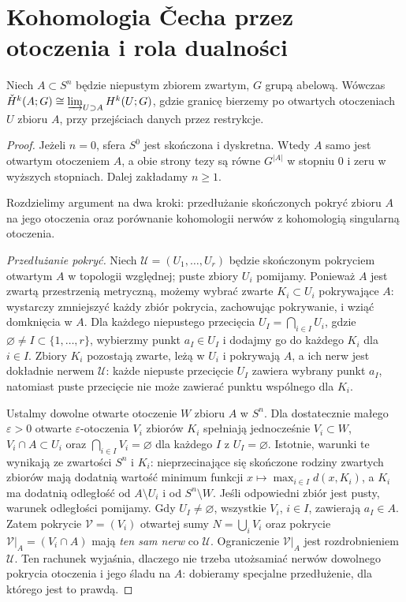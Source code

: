 \section{Kohomologia \v{C}echa przez otoczenia i rola dualności}
\begin{twierdzenie}
\label{thm:cech-neighbourhood-v4}
Niech $A\subset S^n$ będzie niepustym zbiorem zwartym,
$G$ grupą abelową. Wówczas
$\check H^k(A;G)\cong\varinjlim_{U\supset A}H^k(U;G)$,
gdzie granicę bierzemy po otwartych otoczeniach $U$ zbioru
$A$, przy przejściach danych przez restrykcje.
\end{twierdzenie}
\begin{proof}
Jeżeli $n=0$, sfera $S^0$ jest skończona i dyskretna.
Wtedy $A$ samo jest otwartym otoczeniem $A$, a obie strony
tezy są równe $G^{|A|}$ w stopniu $0$ i zeru w wyższych
stopniach. Dalej zakładamy $n\geq1$.

Rozdzielimy argument na dwa kroki: przedłużanie skończonych
pokryć zbioru $A$ na jego otoczenia oraz porównanie
kohomologii nerwów z kohomologią singularną otoczenia.

\emph{Przedłużanie pokryć.}
Niech $\mathcal U=(U_1,\ldots,U_r)$ będzie skończonym
pokryciem otwartym $A$ w topologii względnej;
puste zbiory $U_i$ pomijamy.
Ponieważ $A$ jest zwartą przestrzenią metryczną,
możemy wybrać zwarte $K_i\subset U_i$ pokrywające $A$:
wystarczy zmniejszyć każdy zbiór pokrycia, zachowując
pokrywanie, i wziąć domknięcia w $A$.
Dla każdego niepustego przecięcia
$U_I=\bigcap_{i\in I}U_i$, gdzie
$\varnothing\ne I\subset\{1,\ldots,r\}$,
wybierzmy punkt $a_I\in U_I$ i dodajmy go do
każdego $K_i$ dla $i\in I$. Zbiory $K_i$ pozostają
zwarte, leżą w $U_i$ i pokrywają $A$, a ich nerw
jest dokładnie nerwem $\mathcal U$: każde niepuste
przecięcie $U_I$ zawiera wybrany punkt $a_I$,
natomiast puste przecięcie nie może zawierać
punktu wspólnego dla $K_i$.

Ustalmy dowolne otwarte otoczenie $W$ zbioru $A$
w $S^n$. Dla dostatecznie małego $\varepsilon>0$
otwarte $\varepsilon$-otoczenia $V_i$ zbiorów $K_i$
spełniają jednocześnie $V_i\subset W$,
$V_i\cap A\subset U_i$ oraz
$\bigcap_{i\in I}V_i=\varnothing$ dla każdego
$I$ z $U_I=\varnothing$. Istotnie, warunki te
wynikają ze zwartości $S^n$ i $K_i$:
nieprzecinające się skończone rodziny zwartych
zbiorów mają dodatnią wartość minimum funkcji
$x\mapsto\max_{i\in I}d(x,K_i)$, a
$K_i$ ma dodatnią odległość od $A\setminus U_i$
i od $S^n\setminus W$. Jeśli odpowiedni zbiór
jest pusty, warunek odległości pomijamy.
Gdy $U_I\ne\varnothing$, wszystkie $V_i$,
$i\in I$, zawierają $a_I\in A$.
Zatem pokrycie $\mathcal V=(V_i)$ otwartej sumy $N=\bigcup_iV_i$ oraz
pokrycie $\mathcal V|_A=(V_i\cap A)$ mają
\emph{ten sam nerw} co $\mathcal U$.
Ograniczenie $\mathcal V|_A$ jest rozdrobnieniem
$\mathcal U$. Ten rachunek wyjaśnia, dlaczego
nie trzeba utożsamiać nerwów dowolnego pokrycia
otoczenia i jego śladu na $A$: dobieramy
specjalne przedłużenie, dla którego jest to prawdą.


\end{proof}
